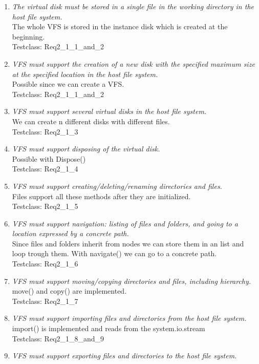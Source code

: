 \documentclass[a4paper,12pt]{article}
\begin{document}
\begin{enumerate}
	\item \emph{The virtual disk must be stored in a single file in the working directory in the host file system.}\\
		The whole VFS is stored in the instance disk which is created at the beginning.\\
		Testclass: Req2\_1\_1\_and\_2
	\item \emph{VFS must support the creation of a new disk with the specified maximum size at the specified
location in the host file system.}\\
		Possible since we can create a VFS.\\
		Testclass: Req2\_1\_1\_and\_2
	\item \emph{VFS must support several virtual disks in the host file system.}\\
		We can create n different disks with different files.\\
		Testclass: Req2\_1\_3
	\item \emph{VFS must support disposing of the virtual disk.}\\
		Possible with Dispose()\\
		Testclass: Req2\_1\_4
	\item \emph{VFS must support creating/deleting/renaming directories and files.}\\
		Files support all these methods after they are initialized.\\
		Testclass: Req2\_1\_5
	\item \emph{VFS must support navigation: listing of files and folders, and going to a location expressed by a
concrete path.}\\
		Since files and folders inherit from nodes we can store them in an list and loop trough them. With navigate() we can go to a concrete path.\\
		Testclass: Req2\_1\_6
	\item \emph{VFS must support moving/copying directories and files, including hierarchy.}\\
		move() and copy() are implemented.\\
		Testclass: Req2\_1\_7
	\item \emph{VFS must support importing files and directories from the host file system.}\\
		import() is implemented and reads from the system.io.stream\\
		Testclass: Req2\_1\_8\_and\_9
	\item \emph{VFS must support exporting files and directories to the host file system.}\\

\end{enumerate}
\end{document}
